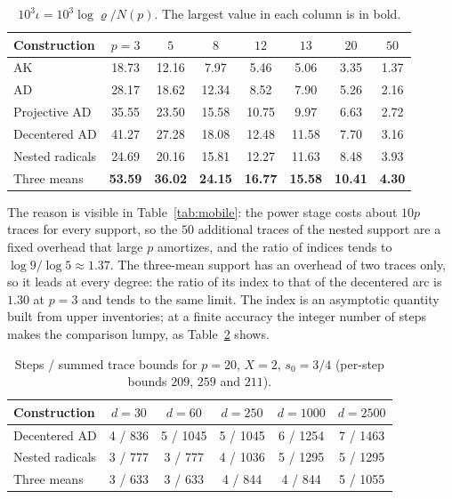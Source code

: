 \begin{table}[h]
\centering\small
\caption{$10^{3}\iota=10^{3}\log\varrho/N(p)$. The largest value in each column is in bold.}\label{tab:index}
\begin{tabular}{@{}lccccccc@{}}
\toprule
Construction & $p=3$ & $5$ & $8$ & $12$ & $13$ & $20$ & $50$\\
\midrule
AK & 18.73 & 12.16 & 7.97 & 5.46 & 5.06 & 3.35 & 1.37\\
AD & 28.17 & 18.62 & 12.34 & 8.52 & 7.90 & 5.26 & 2.16\\
Projective AD & 35.55 & 23.50 & 15.58 & 10.75 & 9.97 & 6.63 & 2.72\\
Decentered AD & 41.27 & 27.28 & 18.08 & 12.48 & 11.58 & 7.70 & 3.16\\
Nested radicals & 24.69 & 20.16 & 15.81 & 12.27 & 11.63 & 8.48 & 3.93\\
Three means & \textbf{53.59} & \textbf{36.02} & \textbf{24.15} & \textbf{16.77} & \textbf{15.58} & \textbf{10.41} & \textbf{4.30}\\
\bottomrule
\end{tabular}
\end{table}

The reason is visible in Table~\ref{tab:mobile}: the power stage costs about $10p$ traces for every
support, so the $50$ additional traces of the nested support are a fixed overhead that large $p$
amortizes, and the ratio of indices tends to $\log9/\log5\approx1.37$. The three-mean support has an
overhead of two traces only, so it leads at every degree: the ratio of its index to that of the
decentered arc is $1.30$ at $p=3$ and tends to the same limit. The index is an asymptotic
quantity built from upper inventories; at a finite accuracy the integer number of steps makes the
comparison lumpy, as Table~\ref{tab:p20} shows.

\begin{table}[h]
\centering\small
\caption{Steps / summed trace bounds for $p=20$, $X=2$, $s_0=3/4$ (per-step bounds $209$, $259$ and
$211$).}\label{tab:p20}
\begin{tabular}{@{}lccccc@{}}
\toprule
Construction & $d=30$ & $d=60$ & $d=250$ & $d=1000$ & $d=2500$\\
\midrule
Decentered AD & 4 / 836 & 5 / 1045 & 5 / 1045 & 6 / 1254 & 7 / 1463\\
Nested radicals & 3 / 777 & 3 / 777 & 4 / 1036 & 5 / 1295 & 5 / 1295\\
Three means & 3 / 633 & 3 / 633 & 4 / 844 & 4 / 844 & 5 / 1055\\
\bottomrule
\end{tabular}
\end{table}

